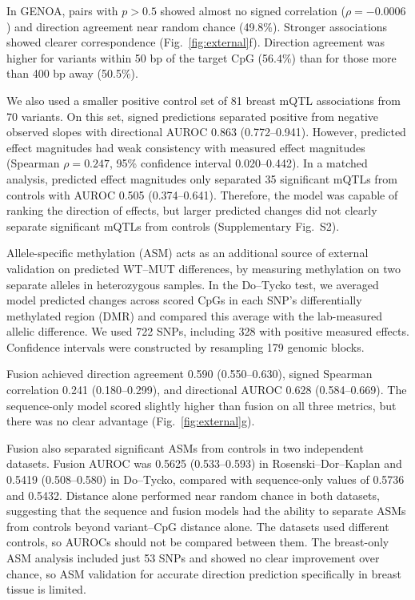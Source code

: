 \documentclass[11pt,letterpaper]{article}
\begin{document}
In GENOA, pairs with $p>0.5$ showed almost no signed correlation ($\rho=-0.0006$) and direction agreement near random chance (49.8\%). Stronger associations showed clearer correspondence (Fig.~\ref{fig:external}f). Direction agreement was higher for variants within 50 bp of the target CpG (56.4\%) than for those more than 400 bp away (50.5\%).

We also used a smaller positive control set of 81 breast mQTL associations from 70 variants. On this set, signed predictions separated positive from negative observed slopes with directional AUROC 0.863 (0.772--0.941). However, predicted effect magnitudes had weak consistency with measured effect magnitudes (Spearman $\rho=0.247$, 95\% confidence interval 0.020--0.442). In a matched analysis, predicted effect magnitudes only separated 35 significant mQTLs from controls with AUROC 0.505 (0.374--0.641). Therefore, the model was capable of ranking the direction of effects, but larger predicted changes did not clearly separate significant mQTLs from controls (Supplementary Fig.~S2).

Allele-specific methylation (ASM) acts as an additional source of external validation on predicted WT--MUT differences, by measuring methylation on two separate alleles in heterozygous samples. In the Do--Tycko test, we averaged model predicted changes across scored CpGs in each SNP's differentially methylated region (DMR) and compared this average with the lab-measured allelic difference. We used 722 SNPs, including 328 with positive measured effects. Confidence intervals were constructed by resampling 179 genomic blocks.

Fusion achieved direction agreement 0.590 (0.550--0.630), signed Spearman correlation 0.241 (0.180--0.299), and directional AUROC 0.628 (0.584--0.669). The sequence-only model scored slightly higher than fusion on all three metrics, but there was no clear advantage (Fig.~\ref{fig:external}g).

Fusion also separated significant ASMs from controls in two independent datasets. Fusion AUROC was 0.5625 (0.533--0.593) in Rosenski--Dor--Kaplan and 0.5419 (0.508--0.580) in Do--Tycko, compared with sequence-only values of 0.5736 and 0.5432. Distance alone performed near random chance in both datasets, suggesting that the sequence and fusion models had the ability to separate ASMs from controls beyond variant--CpG distance alone. The datasets used different controls, so AUROCs should not be compared between them. The breast-only ASM analysis included just 53 SNPs and showed no clear improvement over chance, so ASM validation for accurate direction prediction specifically in breast tissue is limited.
\end{document}
